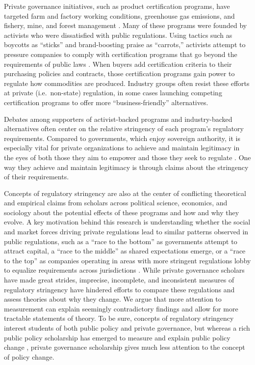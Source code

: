 \documentclass[
      12pt,
            Review ]{article}
\begin{document}
Private governance initiatives, such as product certification programs,
have targeted farm and factory working conditions, greenhouse gas
emissions, and fishery, mine, and forest management
\citep{Auld2014, Bartley2003, Bozzi2012, Hudson2003, VanderVen2015, Vince2017}.
Many of these programs were founded by activists who were dissatisfied
with public regulations. Using tactics such as boycotts as ``sticks''
and brand-boosting praise as ``carrots,'' activists attempt to pressure
companies to comply with certification programs that go beyond the
requirements of public laws \citep{Cashore2002}. When buyers add
certification criteria to their purchasing policies and contracts, those
certification programs gain power to regulate how commodities are
produced. Industry groups often resist these efforts at private
(i.e.~non-state) regulation, in some cases launching competing
certification programs to offer more ``business-friendly'' alternatives.

Debates among supporters of activist-backed programs and industry-backed
alternatives often center on the relative stringency of each program's
regulatory requirements. Compared to governments, which enjoy sovereign
authority, it is especially vital for private organizations to achieve
and maintain legitimacy in the eyes of both those they aim to empower
and those they seek to regulate
\citep{Bartley2007, Bodansky1999, Cashore2002}. One way they achieve and
maintain legitimacy is through claims about the stringency of their
requirements.

Concepts of regulatory stringency are also at the center of conflicting
theoretical and empirical claims from scholars across political science,
economics, and sociology about the potential effects of these programs
and how and why they evolve. A key motivation behind this research is
understanding whether the social and market forces driving private
regulations lead to similar patterns observed in public regulations,
such as a ``race to the bottom'' as governments attempt to attract
capital, a ``race to the middle'' as shared expectations emerge, or a
``race to the top'' as companies operating in areas with more stringent
regulations lobby to equalize requirements across jurisdictions
\citep{Berger1996, Rodrik2004, Vogel1995}. While private governance
scholars have made great strides, imprecise, incomplete, and
inconsistent measures of regulatory stringency have hindered efforts to
compare these regulations and assess theories about why they change. We
argue that more attention to measurement can explain seemingly
contradictory findings and allow for more tractable statements of
theory. To be sure, concepts of regulatory stringency interest students
of both public policy and private governance, but whereas a rich public
policy scholarship has emerged to measure and explain public policy
change \citep{Green-Pedersen2007, Hall1993, Howlett2014}, private
governance scholarship gives much less attention to the concept of
policy change.
\end{document}
